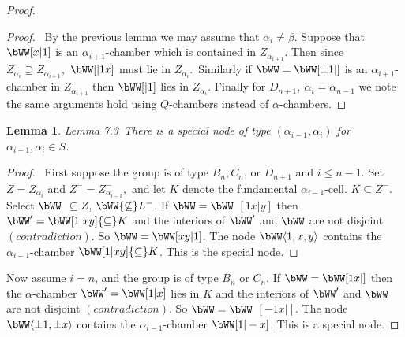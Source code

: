 \documentclass{memo-l}
\newtheorem{lemma}[theorem]{Lemma}
\theoremstyle{definition}
\theoremstyle{remark}
\numberwithin{section}{chapter}
\numberwithin{equation}{chapter}
\begin{document}
\begin{proof}
\begin{proof} \ By the previous lemma we may assume that ${\alpha}_{i}
\ne {\beta}$.  Suppose that $\bWW[x\vert 1]$ is an
${\alpha}_{i+1}$-chamber which is contained in $Z_{\alpha_{i+1}}.$
Then since $Z_{\alpha_i} {\supseteq} Z_{\alpha_{i+1}},$ 
$\bWW[\vert 1x]$ must lie in $Z_{\alpha_i}.$\ 
Similarly if $\bWW = \bWW[{\pm}1\vert ]$ is an ${\alpha}_{i+1}$-chamber in
$Z_{\alpha_{i+1}}$ then $\bWW[\vert 1]$ lies in 
$Z_{\alpha_i}.$ Finally for $D_{n+1},\  {\alpha}_{i} = {\alpha}_{n-1}$ we
note the same arguments hold using $Q$-chambers instead of
${\alpha}$-chambers.
\end{proof} 

{\medskip}



\begin{lemma}{Lemma 7.3}\ There is a special node of type
$({\alpha}_{i-1},{\alpha}_{i})$ for ${\alpha}_{i-1},{\alpha}_{i}  \in  S$.
\end{lemma}


\begin{proof} \ First suppose the group is of type $B_{n}, C_{n}$, or
$D_{n+1}$ and $i\le n-1$.  Set $Z = Z_{\alpha_i}$ and $Z^{-} =
Z^{-}_{\alpha_{i-1}},$ and let $K$ denote the fundamental
${\alpha}_{i-1}$-cell.  $K {\subseteq} Z^{-}$.  Select $\bWW$
${\subseteq}Z$, $\bWW{\not\subseteq}L^{-}$.  If $\bWW = \bWW$
$[1x\vert y]$ then $\bWW'= \bWW[1\vert xy]{\subseteq}K$ and the
interiors of $\bWW'$ and $\bWW$ are not disjoint $(contradiction)$.
So $\bWW = \bWW[xy\vert 1]$.  The node $\bWW\langle 1,x,y\rangle$
contains the ${\alpha_{i-1}}$-chamber $\bWW[1\vert xy]{\subseteq}K$.  This
is the special node.
\end{proof} 

           \medskip
	   \medskip



   Now assume $i = n$, and the group is of type $B_{n}$ or $C_{n}$.  If 
$\bWW = \bWW[1x\vert ]$ then the 
${\alpha}$-chamber $\bWW'=
\bWW[1\vert x]$ lies in $K$ and the interiors of $\bWW'$ and
$\bWW$ are not disjoint $(contradiction)$.  So $\bWW = \bWW$
$[-1x\vert ]$.  The node $\bWW\langle{\pm}1,{\pm}x\rangle$ contains the
${\alpha_{i-1}}$-chamber $\bWW[1\vert -x]$.  This is a special 
node.

\medskip
\medskip

                  

      


\end{proof}
\end{document}

